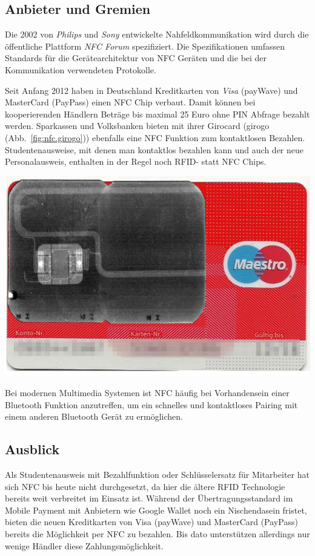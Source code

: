 \begin{multicols}{3}

\subsection*{Anbieter und Gremien}
Die 2002 von \textit{Philips} und \textit{Sony} entwickelte Nahfeldkommunikation wird durch die öffentliche Plattform \textit{NFC Forum} spezifiziert. Die Spezifikationen umfassen Standards für die Gerätearchitektur von NFC Geräten und die bei der Kommunikation verwendeten Protokolle.

Seit Anfang 2012 haben in Deutschland Kreditkarten von \textit{Visa} (payWave) und MasterCard (PayPass) einen NFC Chip verbaut. Damit können bei kooperierenden Händlern Beträge bis maximal 25 Euro ohne PIN Abfrage bezahlt werden. Sparkassen und Volksbanken bieten mit ihrer Girocard (girogo (Abb.~\ref{fig:nfc.girogo})) ebenfalls eine NFC Funktion zum kontaktlosen Bezahlen.
Studentenausweise, mit denen man kontaktlos bezahlen kann und auch der neue Personalausweis, enthalten in der Regel noch RFID- statt NFC Chips.

\begin{Figure}
\includegraphics[width=\linewidth]{Kapitel/NFC/Grafiken/girogo.jpg}
\label{fig:nfc.girogo}
\end{Figure}

Bei modernen Multimedia Systemen ist NFC häufig bei Vorhandensein einer Bluetooth Funktion anzutreffen, um ein schnelles und kontaktloses Pairing mit einem anderen Bluetooth Gerät zu ermöglichen.~\cite{nfc.2,nfc.11,nfc.12}


\subsection*{Ausblick}
Als Studentenausweis mit Bezahlfunktion oder Schlüsselersatz für Mitarbeiter hat sich NFC bis heute nicht durchgesetzt, da hier die ältere RFID Technologie bereits weit verbreitet im Einsatz ist. Während der Übertragungsstandard im Mobile Payment mit Anbietern wie Google Wallet noch ein Nischendasein fristet, bieten die neuen Kreditkarten von Visa (payWave) und MasterCard (PayPass) bereits die Möglichkeit per NFC zu bezahlen. Bis dato unterstützen allerdings nur wenige Händler diese Zahlungsmöglichkeit.


\end{multicols}
